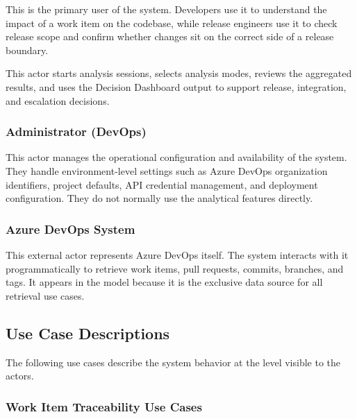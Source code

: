 This is the primary user of the system. Developers use it to understand the
impact of a work item on the codebase, while release engineers use it to check
release scope and confirm whether changes sit on the correct side of a release
boundary.

This actor starts analysis sessions, selects analysis modes, reviews the
aggregated results, and uses the Decision Dashboard output to support release,
integration, and escalation decisions.

\subsubsection{Administrator (DevOps)}

This actor manages the operational configuration and availability of the
system. They handle environment-level settings such as Azure DevOps organization
identifiers, project defaults, API credential management, and deployment
configuration. They do not normally use the analytical features directly.

\subsubsection{Azure DevOps System}

This external actor represents Azure DevOps itself. The system interacts with it
programmatically to retrieve work items, pull requests, commits, branches, and
tags. It appears in the model because it is the exclusive data source for all
retrieval use cases.

\subsection{Use Case Descriptions}
\label{subsec:use-cases}

The following use cases describe the system behavior at the level visible to the
actors.

\subsubsection{Work Item Traceability Use Cases}

